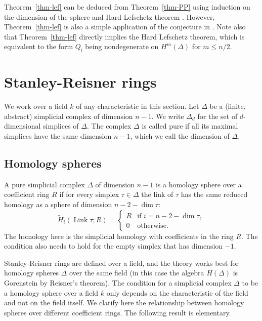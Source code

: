 \documentclass[10pt]{article}
\theoremstyle{definition}
\newcommand{\Link}{\operatorname{Link}}
\begin{document}
Theorem~\ref{thm-lef} can be deduced from Theorem~\ref{thm-PP} using induction on the dimension of the sphere and Hard Lefschetz theorem \cite{PapadakisPetrotou}. However, Theorem~\ref{thm-lef} is also a simple application of the conjecture in \cite{PapadakisPetrotou}. 
Note also that Theorem~\ref{thm-lef} directly implies the Hard Lefschetz theorem, which is equivalent to the form $Q_l$ being nondegenerate on $H^m(\Delta)$ for $m \leq n/2$.
\setcounter{section}{1}
\section{Stanley-Reisner rings}
\label{sec-SR}

We work over a field $k$ of any characteristic in this section.
Let $\Delta$ be a (finite, abstract) simplicial complex of dimension $n-1$. We write $\Delta_d$ for the set of $d$-dimensional simplices of $\Delta$. The complex $\Delta$ is called pure if all its maximal simplices have the same dimension $n-1$, which we call the dimension of $\Delta$.

\subsection{Homology spheres} A pure simplicial complex $\Delta$ of dimension $n-1$ is a homology sphere over a coefficient ring $R$ if for every simplex $\tau \in \Delta$ the link of $\tau$ has the same reduced homology as a sphere of dimension $n-2-\dim \tau$:
\[ \tilde{H}_i (\Link\tau; R) = \begin{cases} R & \text{if $i=n-2-\dim\tau$},\\
0 & \text{otherwise.} \end{cases}
\]
 The homology here is the simplicial homology with coefficients in the ring $R$. The condition also needs to hold for the empty simplex that has dimension $-1$. 
 
Stanley-Reisner rings are defined over a field, and the theory works best for homology spheres $\Delta$ over the same field (in this case the algebra $H(\Delta)$ is Gorenstein by Reisner's theorem). The condition for a simplicial complex $\Delta$ to be a homology sphere over a field $k$ only depends on the characteristic of the field and not on the field itself. We clarify here the relationship between homology spheres over different coefficient rings. The following result is elementary.
\end{document}
